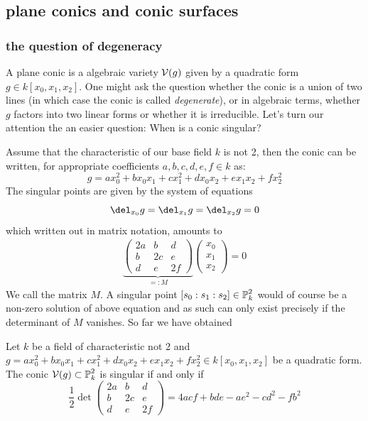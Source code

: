 \subsection{plane conics and conic surfaces}

\subsubsection{the question of degeneracy}

A plane conic is a algebraic variety $\operatorname{\mathcal V}(g)$ given by a quadratic form $g \in k[x_0,x_1,x_2]$. One might ask the question whether the conic is a union of two lines (in which case the conic is called \emph{degenerate}), or in algebraic terms, whether $g$ factors into two linear forms or whether it is irreducible.
Let's turn our attention the an easier question: When is a conic singular?

Assume that the characteristic of our base field $k$ is not 2, then the conic can be written, for appropriate coefficients $a,b,c,d,e,f \in k$ as:
\begin{equation}
g = ax_0^2 + bx_0x_1 + cx_1^2 + dx_0x_2 + ex_1x_2 + fx_2^2
\end{equation}
The singular points are given by the system of equations
\begin{equation}
\del_{x_0} g = \del_{x_1} g = \del_{x_2} g = 0
\end{equation}
which written out in matrix notation, amounts to
\begin{align}
\underset{=:M}{\underbrace{
\begin{pmatrix}
2a & b & d \\
b & 2c & e \\
d & e & 2f
\end{pmatrix}
}}
\begin{pmatrix}
x_0 \\ x_1 \\ x_2
\end{pmatrix}
= 0
\end{align}
We call the matrix $M$.
A singular point $[s_0:s_1:s_2] \in \operatorname{\mathbb P}^2_k$ would of course be a non-zero solution of above equation and as such can only exist precisely if the determinant of $M$ vanishes.
So far we have obtained

\begin{corollary}
Let $k$ be a field of characteristic not 2 and $g =  ax_0^2 + bx_0x_1 + cx_1^2 + dx_0x_2 + ex_1x_2 + fx_2^2
\in k[x_0,x_1,x_2]$ be a quadratic form. The conic $\operatorname{\mathcal V}(g) \subset \operatorname{\mathbb P}^2_k$ is singular if and only if
\begin{equation}
\frac 12
\det
\begin{pmatrix}
2a & b & d \\
b & 2c & e \\
d & e & 2f
\end{pmatrix}
= 4acf + bde - ae^2 - cd^2 - fb^2
\end{equation}
\end{corollary}


